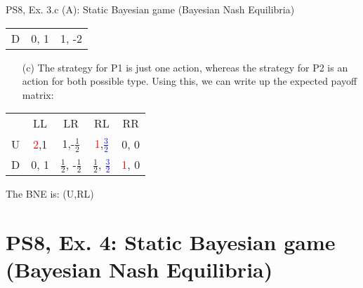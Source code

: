 \begin{frame}{PS8, Ex. 3.c (A): Static Bayesian game (Bayesian Nash Equilibria)}
\begin{multicols}{2}
\begin{table}
\begin{tabular}{l|c|c|}
        D & 0, 1 & 1, -2 \\\cline{2-3}
      \end{tabular}
    \end{table}
    \vspace{-8pt}
    \begin{itemize}
        \item[(c)] The strategy for P1 is just one action, whereas the strategy for P2 is an action for both possible type. Using this, we can write up the expected payoff matrix:
    \end{itemize}
    \vspace{-12pt}
    \begin{table}
      \begin{tabular}{l|c|c|c|c|}
        \multicolumn{1}{c}{} & \multicolumn{1}{c}{LL} & \multicolumn{1}{c}{LR} & \multicolumn{1}{c}{RL} & \multicolumn{1}{c}{RR} \\\cline{2-5}
        U & \textcolor{red}{2},1 &  1,-$\frac{1}{2}$ & \textcolor{red}{1},\textcolor{blue}{$\frac{3}{2}$} & 0, 0  \\\cline{2-5}
        D & 0, 1  & $\frac{1}{2}$, -$\frac{1}{2}$ & $\frac{1}{2}$, \textcolor{blue}{$\frac{3}{2}$} & \textcolor{red}{1}, 0  \\\cline{2-5}
      \end{tabular}
    \end{table}
    \vspace{-4pt}
    The BNE is: (U,RL)
    \vfill\null
  \end{multicols}
\end{frame}



\section{PS8, Ex. 4: Static Bayesian game (Bayesian Nash Equilibria)}

